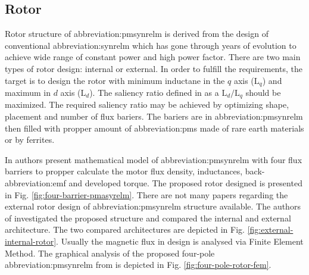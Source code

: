 \documentclass[a4paper, twoside, 11pt]{article}
\begin{document}
    \subsection{Rotor}
    Rotor structure of \gls{abbreviation:pmsynrelm} is derived from the design of conventional \gls{abbreviation:synrelm} which has gone through years of evolution to achieve wide range of constant power and high power factor. There are two main types of rotor design: internal or external. In order to fulfill the requirements, the target is to design the rotor with minimum inductane in the $q$ axis ($\text{L}_q$) and maximum in $d$ axis ($\text{L}_d$). The saliency ratio defined in \cite{talebi-Design-of-Permanent-Magnet-Assisted-Synchronous-Reluctance-Motors-Made-Easy} as a $\text{L}_d/\text{L}_q$ should be maximized. The required saliency ratio may be achieved by optimizing shape, placement and number of flux bariers. The bariers are in \gls{abbreviation:pmsynrelm} then filled with propper amount of \gls{abbreviation:pm}s made of rare earth materials or by ferrites. \cite{talebi-Design-of-Permanent-Magnet-Assisted-Synchronous-Reluctance-Motors-Made-Easy}\par
    In \cite{talebi-Design-of-Permanent-Magnet-Assisted-Synchronous-Reluctance-Motors-Made-Easy} authors present mathematical model of \gls{abbreviation:pmsynrelm} with four flux barriers to propper calculate the motor flux density, inductances, back-\gls{abbreviation:emf} and developed torque. The proposed rotor designed is presented in Fig. \ref{fig:four-barrier-pmasyrelm}. There are not many papers regarding the external rotor design of \gls{abbreviation:pmsynrelm} structure available. The authors of \cite{bonthu-Design-of-permanent-magnet-assisted-synchronous-reluctance-motor-with-external-rotor-architecture} investigated the proposed structure and compared the internal and external architecture. The two compared architectures are depicted in Fig. \ref{fig:external-internal-rotor}. Usually the magnetic flux in design is analysed via Finite Element Method. The graphical analysis of the proposed four-pole \gls{abbreviation:pmsynrelm} from \cite{talebi-Design-of-Permanent-Magnet-Assisted-Synchronous-Reluctance-Motors-Made-Easy} is depicted in Fig. \ref{fig:four-pole-rotor-fem}.
\end{document}
